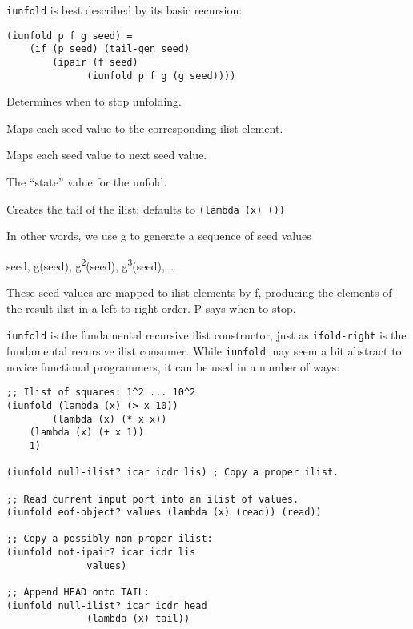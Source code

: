 \begin{entry}{%
  }

\texttt{iunfold} is best described by its basic recursion:

\begin{verbatim}
(iunfold p f g seed) = 
    (if (p seed) (tail-gen seed)
        (ipair (f seed)
              (iunfold p f g (g seed))))
\end{verbatim}

\begin{description}
  \tightlist
\item[ p ] Determines when to stop unfolding.
\item[ f ] Maps each seed value to the corresponding ilist element.
\item[ g ] Maps each seed value to next seed value.
\item[ seed ] The ``state'' value for the unfold.
\item[ tail-gen ] Creates the tail of the ilist; defaults to
  \texttt{(lambda\ (x)\ \textquotesingle{}())}
\end{description}

In other words, we use g to generate a sequence of seed values

seed, g(seed), g\textsuperscript{2}(seed), g\textsuperscript{3}(seed),
\ldots{}

These seed values are mapped to ilist elements by f, producing the
elements of the result ilist in a left-to-right order. P says when to
stop.

\texttt{iunfold} is the fundamental recursive ilist constructor, just
as \texttt{ifold-right} is the fundamental recursive ilist
consumer. While \texttt{iunfold} may seem a bit abstract to novice
functional programmers, it can be used in a number of ways:

\begin{verbatim}
;; Ilist of squares: 1^2 ... 10^2
(iunfold (lambda (x) (> x 10))
        (lambda (x) (* x x))
    (lambda (x) (+ x 1))
    1)
        
(iunfold null-ilist? icar icdr lis) ; Copy a proper ilist.

;; Read current input port into an ilist of values.
(iunfold eof-object? values (lambda (x) (read)) (read))

;; Copy a possibly non-proper ilist:
(iunfold not-ipair? icar icdr lis 
              values)

;; Append HEAD onto TAIL:
(iunfold null-ilist? icar icdr head 
              (lambda (x) tail))
\end{verbatim}


\end{entry}
